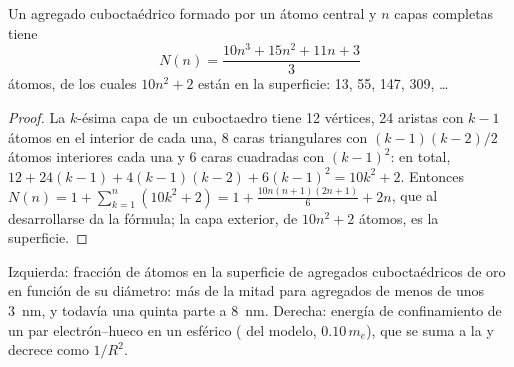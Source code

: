\begin{proposition}\label{prop:b3:inorganic-materials:magic}
Un agregado cuboctaédrico formado por un átomo central y $n$ capas completas tiene
\[
  N(n) = \frac{10n^3 + 15n^2 + 11n + 3}{3}
\]
átomos, de los cuales $10n^2 + 2$ están en la superficie: 13, 55, 147, 309, \dots
\end{proposition}

\begin{proof}
La $k$-ésima capa de un cuboctaedro tiene 12 vértices, 24 aristas con $k - 1$ átomos
en el interior de cada una, 8 caras triangulares con $(k - 1)(k - 2)/2$ átomos interiores cada una y 6
caras cuadradas con $(k - 1)^2$: en total, $12 + 24(k - 1) + 4(k - 1)(k - 2) + 6(k - 1)^2 = 10k^2 + 2$. Entonces
$N(n) = 1 + \sum_{k=1}^{n}(10k^2 + 2) = 1 + \frac{10n(n + 1)(2n + 1)}{6} + 2n$, que al desarrollarse da la fórmula; la
capa exterior, de $10n^2 + 2$ átomos, es la superficie.
\end{proof}

\begin{omfigure}

{\small Izquierda: fracción de átomos en la superficie de agregados cuboctaédricos de oro
en función de su diámetro: más de la mitad para agregados de menos de unos
\qty{3}{nm}, y todavía una quinta parte a \qty{8}{nm}. Derecha: energía de confinamiento de un
par electrón--hueco en un  esférico ( del modelo, $0.10\,m_e$),
que se suma a la  y decrece como $1/R^2$.}
\end{omfigure}

